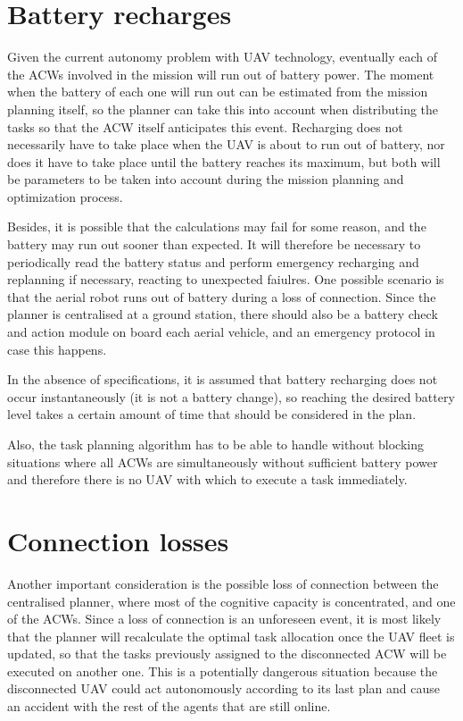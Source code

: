 \section{Battery recharges}
\label{sec:BatteryRecharges}
Given the current autonomy problem with \gls{UAV} technology, eventually each of the \glspl{ACW} involved in the mission will run out of battery power. The moment when the battery of each one will run out can be estimated from the mission planning itself, so the planner can take this into account when distributing the tasks so that the \gls{ACW} itself anticipates this event. Recharging does not necessarily have to take place when the \gls{UAV} is about to run out of battery, nor does it have to take place until the battery reaches its maximum, but both will be parameters to be taken into account during the mission planning and optimization process.

Besides, it is possible that the calculations may fail for some reason, and the battery may run out sooner than expected. It will therefore be necessary to periodically read the battery status and perform emergency recharging and replanning if necessary, reacting to unexpected faiulres. One possible scenario is that the aerial robot runs out of battery during a loss of connection. Since the planner is centralised at a ground station, there should also be a battery check and action module on board each aerial vehicle, and an emergency protocol in case this happens.

In the absence of specifications, it is assumed that battery recharging does not occur instantaneously (it is not a battery change), so reaching the desired battery level takes a certain amount of time that should be considered in the plan.

Also, the task planning algorithm has to be able to handle without blocking situations where all \glspl{ACW} are simultaneously without sufficient battery power and therefore there is no \gls{UAV} with which to execute a task immediately.

\section{Connection losses}
\label{sec:ConnectionLosses}
Another important consideration is the possible loss of connection between the centralised planner, where most of the cognitive capacity is concentrated, and one of the \glspl{ACW}. Since a loss of connection is an unforeseen event, it is most likely that the planner will recalculate the optimal task allocation once the \gls{UAV} fleet is updated, so that the tasks previously assigned to the disconnected \gls{ACW} will be executed on another one. This is a potentially dangerous situation because the disconnected \gls{UAV} could act autonomously according to its last plan and cause an accident with the rest of the agents that are still online.

